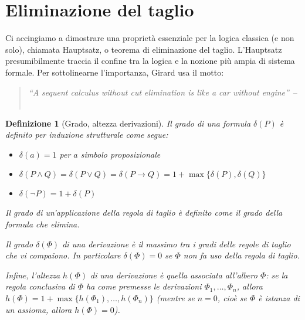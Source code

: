 \documentclass[12pt,a4paper,openright,twoside]{report}
\newtheorem{dfn}[thm]{Definizione}
\begin{document}
\section{Eliminazione del taglio}

Ci accingiamo a dimostrare una propriet\`a essenziale per la logica classica (e non solo), chiamata Hauptsatz, o teorema di eliminazione del taglio. L'Hauptsatz presumibilmente traccia il confine tra la logica e la nozione pi\`u ampia di sistema formale. Per sottolinearne l'importanza, Girard usa il motto:
\begin{quote}
	\emph{``A sequent calculus without cut elimination is like a car without engine''}~--~\cite{Gir95}
\end{quote}

\begin{dfn}[Grado, altezza derivazioni]
Il \emph{grado di una formula} $\delta(P)$ \`e definito per induzione strutturale come segue:
\begin{itemize}
	\item $\delta(a) = 1$ \qquad per $a$ simbolo proposizionale
	\item $\delta(P \wedge Q) = \delta(P \vee Q) = \delta(P \rightarrow Q) = 1 + \max\{\delta(P), \delta(Q)\}$
	\item $\delta(\neg P) = 1 + \delta(P)$
\end{itemize}

Il \emph{grado di un'applicazione della regola di taglio} \`e definito come il grado della formula che elimina.

Il \emph{grado} $\delta(\Phi)$ \emph{di una derivazione} \`e il massimo tra i gradi delle regole di taglio che vi compaiono. In particolare $\delta(\Phi) = 0$ se $\Phi$ non fa uso della regola di taglio.

Infine, l'\emph{altezza} $h(\Phi)$ \emph{di una derivazione} \`e quella associata all'albero $\Phi$: se la regola conclusiva di $\Phi$ ha come premesse le derivazioni $\Phi_1, \ldots, \Phi_n$, allora $h(\Phi) = 1 + \max\{h(\Phi_1), \ldots, h(\Phi_n)\}$ (mentre se $n = 0$, cio\`e se $\Phi$ \`e istanza di un assioma, allora $h(\Phi) = 0$).
\end{dfn}
\end{document}
